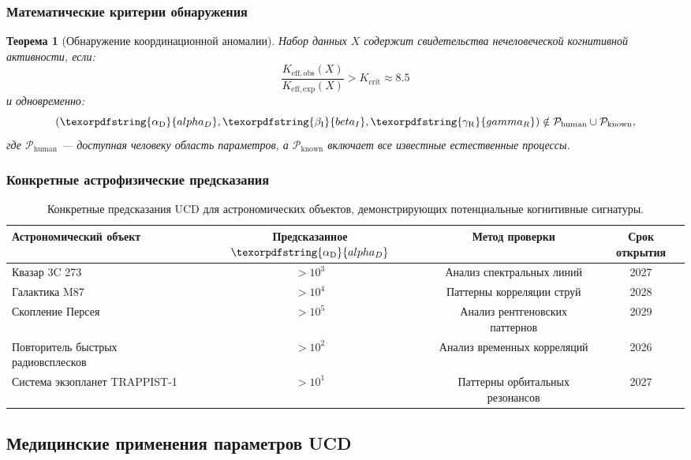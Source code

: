 \documentclass[12pt,a4paper]{article}
\newtheorem{theorem}{Теорема}
\DeclareRobustCommand{\alD}{\texorpdfstring{\ensuremath{\alpha_{\mathrm{D}}}}{alpha_D}}
\DeclareRobustCommand{\beI}{\texorpdfstring{\ensuremath{\beta_{\mathrm{I}}}}{beta_I}}
\DeclareRobustCommand{\gaR}{\texorpdfstring{\ensuremath{\gamma_{\mathrm{R}}}}{gamma_R}}
\newcommand{\eff}{\mathrm{eff}}
\newcommand{\Keobs}{K_{\eff,\mathrm{obs}}}
\newcommand{\Keexp}{K_{\eff,\mathrm{exp}}}
\newcommand{\Kcrit}{K_{\mathrm{crit}}}
\begin{document}
	\subsubsection{Математические критерии обнаружения}
	
	\begin{theorem}[Обнаружение координационной аномалии]
		Набор данных \(X\) содержит свидетельства нечеловеческой когнитивной активности, если:
		\[
		\frac{\Keobs(X)}{\Keexp(X)} > \Kcrit \approx 8.5
		\]
		и одновременно:
		\[
		(\alD, \beI, \gaR) \notin \mathcal{P}_{\mathrm{human}} \cup \mathcal{P}_{\mathrm{known}},
		\]
		где \(\mathcal{P}_{\mathrm{human}}\) — доступная человеку область параметров, а \(\mathcal{P}_{\mathrm{known}}\) включает все известные естественные процессы.
	\end{theorem}
	
	\subsubsection{Конкретные астрофизические предсказания}
	
	\begin{table}[ht]
		\centering
		\begin{tabular}{lccc}
			\toprule
			\textbf{Астрономический объект} & \textbf{Предсказанное \(\alD\)} & \textbf{Метод проверки} & \textbf{Срок открытия} \\
			\midrule
			Квазар 3C 273 & \(>10^3\) & Анализ спектральных линий & 2027 \\
			Галактика M87 & \(>10^4\) & Паттерны корреляции струй & 2028 \\
			Скопление Персея & \(>10^5\) & Анализ рентгеновских паттернов & 2029 \\
			Повторитель быстрых радиовсплесков & \(>10^2\) & Анализ временных корреляций & 2026 \\
			Система экзопланет TRAPPIST-1 & \(>10^1\) & Паттерны орбитальных резонансов & 2027 \\
			\bottomrule
		\end{tabular}
		\caption{Конкретные предсказания UCD для астрономических объектов, демонстрирующих потенциальные когнитивные сигнатуры.}
		\label{tab:astro-predictions}
	\end{table}
	
	\subsection{Медицинские применения параметров UCD}
	
\end{document}
